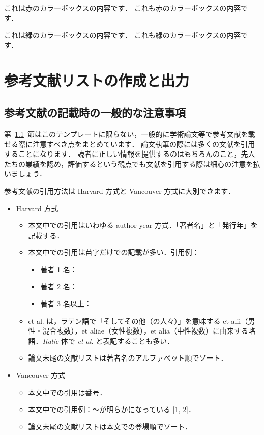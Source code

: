 \documentclass[
    paper=a4paper,      %
    article,            %
    fontsize=11pt,      %
    jafontsize=11pt,    %
    head_space=25mm,    %
    foot_space=25mm,    %
    gutter=20mm,        %
    fore-edge=20mm      %
    ]{jlreq}            %
\begin{document}
\begin{redbox}[title={赤のカラーボックス}]
  これは赤のカラーボックスの内容です．
  \tcblower
  これも赤のカラーボックスの内容です．
\end{redbox}

\begin{greenbox}[title={緑のカラーボックス}]
  これは緑のカラーボックスの内容です．
  \tcblower
  これも緑のカラーボックスの内容です．
\end{greenbox}

\section{参考文献リストの作成と出力}
\label{sec:bibliography}

\subsection{参考文献の記載時の一般的な注意事項}
\label{ssec:bib-caution}

第~\ref{ssec:bib-caution}~節はこのテンプレートに限らない，一般的に学術論文等で参考文献を載せる際に注意すべき点をまとめています．
論文執筆の際には多くの文献を引用することになります．
読者に正しい情報を提供するのはもちろんのこと，先人たちの業績を認め，評価するという観点でも文献を引用する際は細心の注意を払いましょう．


参考文献の引用方法は Harvard 方式と Vancouver 方式に大別できます．

\begin{itemize}
  \item Harvard 方式
  \begin{itemize}
    \item 本文中での引用はいわゆる author-year 方式．「著者名」と「発行年」を記載する．
    \item 本文中での引用は苗字だけでの記載が多い．引用例：
    \begin{itemize}
      \item 著者 1 名：\citet{Reynolds:PhilTransRoySoc1883}
      \item 著者 2 名：\citet{Schmid:Springer2001}
      \item 著者 3 名以上：\citet{Berghout:JFM2020}
    \end{itemize}
    \item et al. は，ラテン語で「そしてその他（の人々）」を意味する et alii（男性・混合複数），et aliae（女性複数），et alia（中性複数）に由来する略語．\textit{Italic} 体で \textit{et al.} と表記することも多い．
    \item 論文末尾の文献リストは著者名のアルファベット順でソート．
  \end{itemize}
  \item Vancouver 方式
  \begin{itemize}
    \item 本文中での引用は番号．
    \item 本文中での引用例：～が明らかになっている [1, 2]．
    \item 論文末尾の文献リストは本文での登場順でソート．
  \end{itemize}
\end{itemize}
\end{document}
